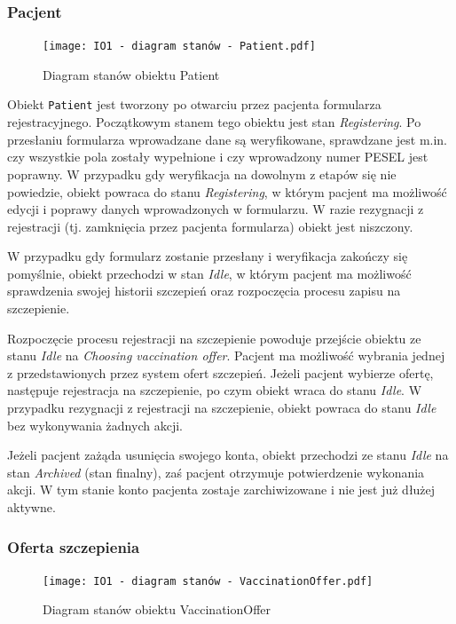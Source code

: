 \documentclass[a4paper,12pt,polish]{article}
\begin{document}
\subsubsection{Pacjent}
\begin{figure}[h]
    \texttt{[image: IO1 - diagram stanów - Patient.pdf]} 
    \caption{Diagram stanów obiektu Patient \label{fig:diagram-uml}}
\end{figure}
Obiekt \texttt{Patient} jest tworzony po otwarciu przez pacjenta formularza rejestracyjnego. Początkowym stanem tego obiektu jest stan \textit{Registering}. Po przesłaniu formularza wprowadzane dane są weryfikowane, sprawdzane jest m.in. czy wszystkie pola zostały wypełnione i czy wprowadzony numer PESEL jest poprawny. W przypadku gdy weryfikacja na dowolnym z etapów się nie powiedzie, obiekt powraca do stanu \textit{Registering}, w którym pacjent ma możliwość edycji i poprawy danych wprowadzonych w formularzu.
W razie rezygnacji z rejestracji (tj. zamknięcia przez pacjenta formularza) obiekt jest niszczony.

W przypadku gdy formularz zostanie przesłany i weryfikacja zakończy się pomyślnie, obiekt przechodzi w stan \textit{Idle}, w którym pacjent ma możliwość sprawdzenia swojej historii szczepień oraz rozpoczęcia procesu zapisu na szczepienie.

Rozpoczęcie procesu rejestracji na szczepienie powoduje przejście obiektu ze stanu \textit{Idle} na \textit{Choosing vaccination offer}. Pacjent ma możliwość wybrania jednej z przedstawionych przez system ofert szczepień. Jeżeli pacjent wybierze ofertę, następuje rejestracja na szczepienie, po czym obiekt wraca do stanu \textit{Idle}. W przypadku rezygnacji z rejestracji na szczepienie, obiekt powraca do stanu \textit{Idle} bez wykonywania żadnych akcji.

Jeżeli pacjent zażąda usunięcia swojego konta, obiekt przechodzi ze stanu \textit{Idle} na stan \textit{Archived} (stan finalny), zaś pacjent otrzymuje potwierdzenie wykonania akcji. W tym stanie konto pacjenta zostaje zarchiwizowane i nie jest już dłużej aktywne.

\subsubsection{Oferta szczepienia}

\begin{figure}[h]
    \centering
    \texttt{[image: IO1 - diagram stanów - VaccinationOffer.pdf]} 
    \caption{Diagram stanów obiektu VaccinationOffer \label{fig:diagram-uml}}
\end{figure}
\end{document}
